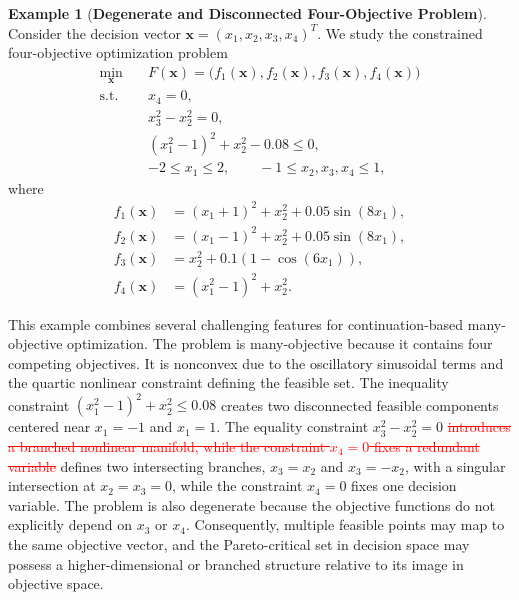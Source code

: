 \documentclass[11pt,pdflatex,sn-mathphys-ay]{sn-jnl}%
\theoremstyle{definition}
\theoremstyle{thmstyleone}%
\theoremstyle{thmstyletwo}%
\newtheorem{example}{Example}%
\theoremstyle{thmstylethree}%
\newcommand{\del}[1]{\textcolor{red}{\sout{#1}}}
\newcommand{\add}[1]{\textcolor{revisionblue}{#1}}
\begin{document}
	\begin{example}[\textbf{Degenerate and Disconnected Four-Objective Problem}]
		
		Consider the decision vector \(\bm{x}=(x_1,x_2,x_3,x_4)^T\). We study the constrained four-objective optimization problem
		\begin{equation}
			\label{eq:degenerate_disconnected_mop_eq}
			\begin{aligned}
				\min_{\bm{x}}\quad
				&F(\bm{x})=
				\bigl(f_1(\bm{x}),f_2(\bm{x}),f_3(\bm{x}),f_4(\bm{x})\bigr)\\
				\text{s.t.}\quad
				&x_4=0,\\
				&x_3^2-x_2^2=0,\\
				&(x_1^2-1)^2+x_2^2-0.08\le 0,\\
				&-2\le x_1\le 2,\qquad -1\le x_2,x_3,x_4\le 1,
			\end{aligned}
		\end{equation}
		where
		\begin{equation}
			\label{eq:degenerate_disconnected_objectives_eq}
			\begin{aligned}
				f_1(\bm{x})&=(x_1+1)^2+x_2^2+0.05\sin(8x_1),\\
				f_2(\bm{x})&=(x_1-1)^2+x_2^2+0.05\sin(8x_1),\\
				f_3(\bm{x})&=x_2^2+0.1(1-\cos(6x_1)),\\
				f_4(\bm{x})&=(x_1^2-1)^2+x_2^2.
			\end{aligned}
		\end{equation}
	\end{example}
	
	This example combines several challenging features for continuation-based many-objective optimization. The problem is many-objective because it contains four competing objectives. It is nonconvex due to the oscillatory sinusoidal terms and the quartic nonlinear constraint defining the feasible set. The inequality constraint \((x_1^2-1)^2+x_2^2\le0.08\) creates two disconnected feasible components centered near \(x_1=-1\) and \(x_1=1\). The equality constraint \(x_3^2-x_2^2=0\) \del{introduces a branched nonlinear manifold, while the constraint \(x_4=0\) fixes a redundant variable} \add{defines two intersecting branches, $x_3=x_2$ and $x_3=-x_2$, with a singular intersection at $x_2=x_3=0$, while the constraint $x_4=0$
		fixes one decision variable}. The problem is also degenerate because the objective functions do not explicitly depend on \(x_3\) or \(x_4\). Consequently, multiple feasible points may map to the same objective vector, and the Pareto-critical set in decision space may possess a higher-dimensional or branched structure relative to its image in objective space.
	
\end{document}
